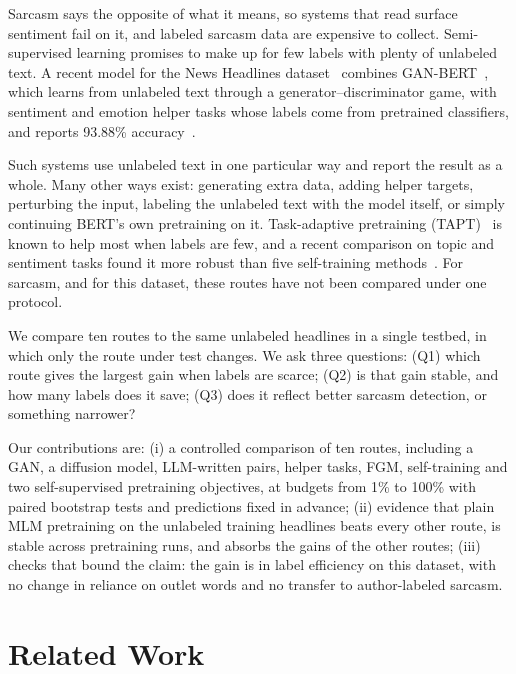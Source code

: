 \documentclass[conference]{IEEEtran}
\begin{document}
Sarcasm says the opposite of what it means, so systems that read surface sentiment fail on it, and labeled sarcasm data are expensive to collect. Semi-supervised learning promises to make up for few labels with plenty of unlabeled text. A recent model for the News Headlines dataset~\cite{misra2023sarcasm} combines GAN-BERT~\cite{croce2020ganbert}, which learns from unlabeled text through a generator--discriminator game, with sentiment and emotion helper tasks whose labels come from pretrained classifiers, and reports 93.88\% accuracy~\cite{irfan2025seed}.

Such systems use unlabeled text in one particular way and report the result as a whole. Many other ways exist: generating extra data, adding helper targets, perturbing the input, labeling the unlabeled text with the model itself, or simply continuing BERT's own pretraining on it. Task-adaptive pretraining (TAPT)~\cite{gururangan2020dont} is known to help most when labels are few, and a recent comparison on topic and sentiment tasks found it more robust than five self-training methods~\cite{shi2023rethinking}. For sarcasm, and for this dataset, these routes have not been compared under one protocol.

We compare ten routes to the same unlabeled headlines in a single testbed, in which only the route under test changes. We ask three questions: (Q1) which route gives the largest gain when labels are scarce; (Q2) is that gain stable, and how many labels does it save; (Q3) does it reflect better sarcasm detection, or something narrower?

Our contributions are: (i) a controlled comparison of ten routes, including a GAN, a diffusion model, LLM-written pairs, helper tasks, FGM, self-training and two self-supervised pretraining objectives, at budgets from 1\% to 100\% with paired bootstrap tests and predictions fixed in advance; (ii) evidence that plain MLM pretraining on the unlabeled training headlines beats every other route, is stable across pretraining runs, and absorbs the gains of the other routes; (iii) checks that bound the claim: the gain is in label efficiency on this dataset, with no change in reliance on outlet words and no transfer to author-labeled sarcasm.

\section{Related Work}
\end{document}
